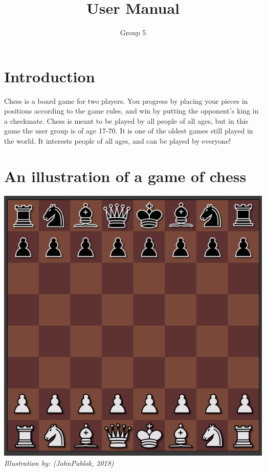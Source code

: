 \documentclass{article}
\title{User Manual}
\author{Group 5}
\date{}
\begin{document}
    \maketitle
    \section{Introduction}
    \noindent
    Chess is a board game for two players. You progress by placing your pieces in positions according to the game rules, and win by putting the opponent's king in a checkmate. Chess is meant to be played by all people of all ages, but in this game the user group is of age 17-70. It is one of the oldest games still played in the world. It interests people of all ages, and can be played by everyone!
    
    \section{An illustration of a game of chess}
    \includegraphics[scale=0.6]{image5.png} \\
    \textit{Illustration by: (JohnPablok, 2018)}
    
\end{document}
